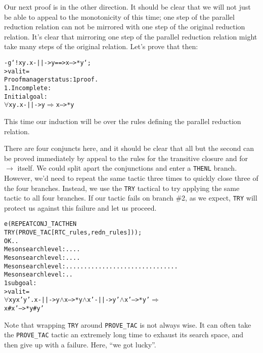 Our next proof is in the other direction.  It should be clear that we
will not just be able to appeal to the monotonicity of  this
time; one step of the parallel reduction relation can not be mirrored
with one step of the original reduction relation.  It's clear that
mirroring one step of the parallel reduction relation might take many
steps of the original relation.  Let's prove that then:
\begin{session}
\begin{alltt}
- g `!x y. x -||-> y   ==>   x -->* y`;
> val it =
    Proof manager status: 1 proof.
    1. Incomplete:
         Initial goal:
         \(\forall\)x y. x -||-> y \(\Rightarrow\) x -->* y
\end{alltt}
\end{session}
This time our induction will be over the rules defining the parallel
reduction relation.
    There are four conjuncts here, and it should be clear that all but
    the second can be proved immediately by appeal to the rules for
    the transitive closure and for $\rightarrow$ itself.  We could
    split apart the conjunctions and enter a \texttt{THENL} branch.
    However, we'd need to repeat the same tactic three times to
    quickly close three of the four branches.  Instead, we use the
    \texttt{TRY} tactical to try applying the same tactic to all four
    branches.  If our tactic fails on branch \#2, as we expect,
    \texttt{TRY} will protect us against this failure and let us
    proceed.
\begin{session}
\begin{alltt}
e (REPEAT CONJ_TAC THEN
   TRY (PROVE_TAC [RTC_rules, redn_rules]));
OK..
Meson search level: ....
Meson search level: ....
Meson search level: ...............................
Meson search level: ..
1 subgoal:
> val it =
    \(\forall\)x y x' y'. x -||-> y \(\land\) x -->* y \(\land\) x' -||-> y' \(\land\) x' -->* y' \(\Rightarrow\)
                x # x' -->* y # y'
\end{alltt}
\end{session}
    Note that wrapping \texttt{TRY} around \texttt{PROVE\_TAC} is not
    always wise.  It can often take the \texttt{PROVE\_TAC} tactic an extremely
    long time to exhaust its search space, and then give up with a
    failure.  Here, ``we got lucky''.

